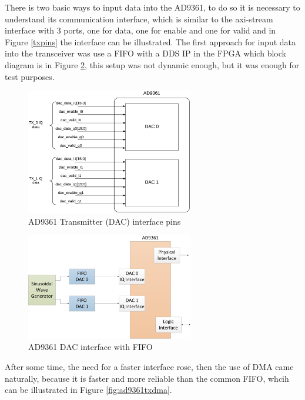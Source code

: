 There is two basic ways to input data into the AD9361, to do so it is necessary
to understand its communication interface, which is similar to the axi-stream
interface with 3 ports, one for data, one for enable and one for valid and in
Figure \ref{txpins} the interface can be illustrated. The first approach for
input data into the transceiver was use a FIFO with a DDS IP in the FPGA which
block diagram is in Figure \ref{fig:ad9361txfifo}, this setup was not dynamic
enough, but it was enough for test purposes.

\begin{figure}[htbp]
    \centering
    \includegraphics[width=0.65\textwidth]{./figures/ad9361tx_pins}
    \caption{ AD9361 Transmitter (DAC) interface pins
    \label{fig:txpins}}
\end{figure}


\begin{figure}[htbp]
    \centering
    \includegraphics[width=0.65\textwidth]{./figures/dac_fifo}
    \caption{ AD9361 DAC interface with FIFO
    \label{fig:ad9361txfifo}}
\end{figure}

 After some time, the need for a faster interface rose, then the use of DMA
came naturally, because it is faster and more reliable than the common FIFO,
whcih can be illustrated in Figure \ref{fig:ad9361txdma}.

